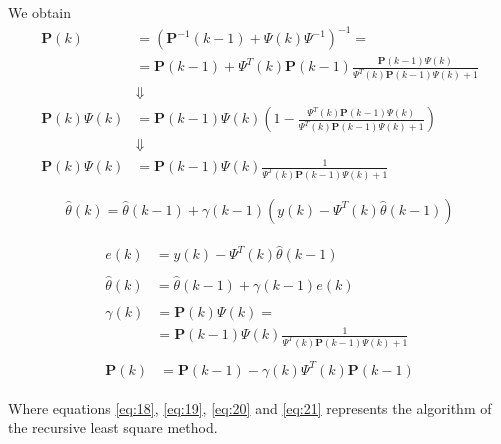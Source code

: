 \documentclass[11pt,a4paper,oneside]{book}
\numberwithin{equation}{section}
\theoremstyle{it}
\theoremstyle{definition}
\begin{document}
We obtain
\begin{equation*}
	\begin{aligned}
		\mathbf{P}(k) &= 
		\left(\mathbf{P}^{-1}(k-1)+\Psi(k)\Psi^{-1}\right)^{-1} = \\[6pt]
		&= \mathbf{P}(k-1) +\Psi^T(k)\mathbf{P}(k-1) \frac{\mathbf{P} 
		(k-1)\Psi(k)}{\Psi^T(k)\mathbf{P}(k-1)\Psi(k)+1} \\[6pt]
		& \Downarrow \\[6pt]
		\mathbf{P}(k)\Psi(k) &= \mathbf{P}(k-1)\Psi(k)\left(1- 
		\frac{\Psi^T(k)\mathbf{P}(k-1)\Psi(k)}{\Psi^T(k)\mathbf{P}(k-1)\Psi(k)+1}\right)
		 \\[6pt]
		& \Downarrow \\[6pt]
		\mathbf{P}(k)\Psi(k) &= \mathbf{P}(k-1) \Psi(k)\frac{1}{\Psi^T(k) 
		\mathbf{P}(k-1)\Psi(k)+1}
	\end{aligned}
\end{equation*} 

\begin{equation*}
	\hat{\theta}(k)=\hat{\theta}(k-1)+\gamma(k-1)\left(y(k)-\Psi^T(k)\hat{\theta}(k-1)
	 \right)
\end{equation*}

\begin{mybox}
	\begin{align}
		\begin{split}\label{eq:18}
			e(k)&=y(k)-\Psi^T(k)\hat{\theta}(k-1)
		\end{split} \\[6pt]
		\begin{split}\label{eq:19}
			\hat{\theta}(k) &= \hat{\theta}(k-1)+\gamma(k-1)e(k)
		\end{split} \\[6pt]
		\begin{split}\label{eq:20}
			\gamma(k) &= \mathbf{P}(k)\Psi(k) = \\[6pt]
			&= \mathbf{P}(k-1)\Psi(k)\frac{1}{\Psi^T(k)\mathbf{P}(k-1)\Psi(k)+1}
		\end{split} \\[6pt]
		\begin{split}\label{eq:21}
			\mathbf{P}(k) &= \mathbf{P}(k-1)-\gamma(k)\Psi^T(k)\mathbf{P}(k-1)
		\end{split} 
	\end{align} 
\end{mybox}
Where equations \eqref{eq:18}, \eqref{eq:19}, \eqref{eq:20} and \eqref{eq:21} 
represents the algorithm of the recursive least square method.
\vspace{10mm}
\end{document}
